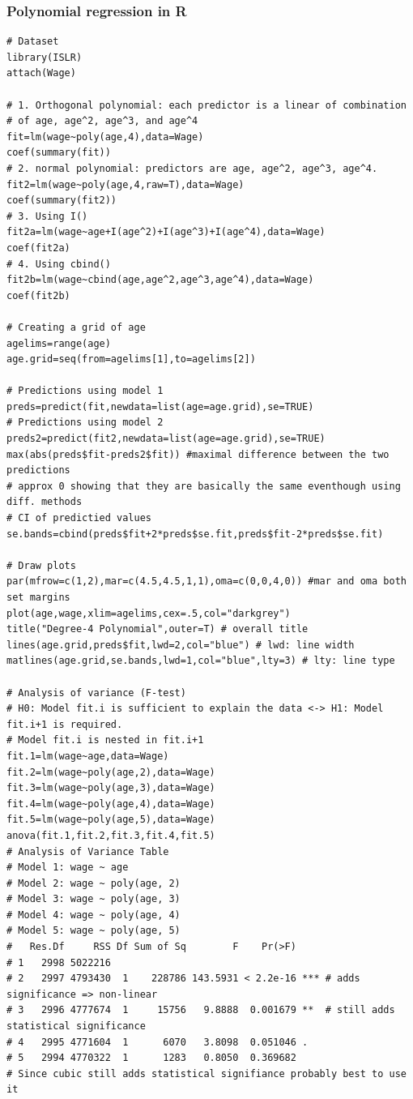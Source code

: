 \documentclass[11pt]{article}
\begin{document}
\subsubsection{Polynomial regression in R}
\begin{lstlisting}
# Dataset
library(ISLR)
attach(Wage)

# 1. Orthogonal polynomial: each predictor is a linear of combination
# of age, age^2, age^3, and age^4
fit=lm(wage~poly(age,4),data=Wage)
coef(summary(fit))
# 2. normal polynomial: predictors are age, age^2, age^3, age^4.
fit2=lm(wage~poly(age,4,raw=T),data=Wage)
coef(summary(fit2))
# 3. Using I()
fit2a=lm(wage~age+I(age^2)+I(age^3)+I(age^4),data=Wage)
coef(fit2a)
# 4. Using cbind()
fit2b=lm(wage~cbind(age,age^2,age^3,age^4),data=Wage)
coef(fit2b)

# Creating a grid of age
agelims=range(age)
age.grid=seq(from=agelims[1],to=agelims[2])

# Predictions using model 1
preds=predict(fit,newdata=list(age=age.grid),se=TRUE)
# Predictions using model 2
preds2=predict(fit2,newdata=list(age=age.grid),se=TRUE)
max(abs(preds$fit-preds2$fit)) #maximal difference between the two predictions
# approx 0 showing that they are basically the same eventhough using diff. methods
# CI of predictied values
se.bands=cbind(preds$fit+2*preds$se.fit,preds$fit-2*preds$se.fit)

# Draw plots
par(mfrow=c(1,2),mar=c(4.5,4.5,1,1),oma=c(0,0,4,0)) #mar and oma both set margins
plot(age,wage,xlim=agelims,cex=.5,col="darkgrey")
title("Degree-4 Polynomial",outer=T) # overall title
lines(age.grid,preds$fit,lwd=2,col="blue") # lwd: line width
matlines(age.grid,se.bands,lwd=1,col="blue",lty=3) # lty: line type

# Analysis of variance (F-test) 
# H0: Model fit.i is sufficient to explain the data <-> H1: Model fit.i+1 is required.
# Model fit.i is nested in fit.i+1
fit.1=lm(wage~age,data=Wage)
fit.2=lm(wage~poly(age,2),data=Wage)
fit.3=lm(wage~poly(age,3),data=Wage)
fit.4=lm(wage~poly(age,4),data=Wage)
fit.5=lm(wage~poly(age,5),data=Wage)
anova(fit.1,fit.2,fit.3,fit.4,fit.5)
# Analysis of Variance Table
# Model 1: wage ~ age
# Model 2: wage ~ poly(age, 2)
# Model 3: wage ~ poly(age, 3)
# Model 4: wage ~ poly(age, 4)
# Model 5: wage ~ poly(age, 5)
#   Res.Df     RSS Df Sum of Sq        F    Pr(>F)    
# 1   2998 5022216                                    
# 2   2997 4793430  1    228786 143.5931 < 2.2e-16 *** # adds significance => non-linear
# 3   2996 4777674  1     15756   9.8888  0.001679 **  # still adds statistical significance
# 4   2995 4771604  1      6070   3.8098  0.051046 .  
# 5   2994 4770322  1      1283   0.8050  0.369682    
# Since cubic still adds statistical signifiance probably best to use it


\end{lstlisting}
\end{document}
